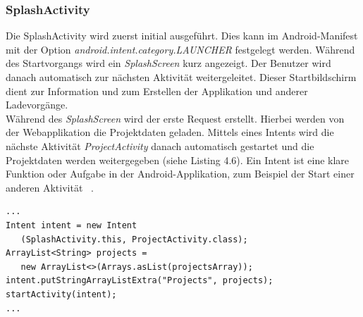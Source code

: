 \subsubsection{SplashActivity}
Die SplashActivity wird zuerst initial ausgeführt. Dies kann im Android-Manifest mit der Option \textit{android.intent.category.LAUNCHER} festgelegt werden. Während des Startvorgangs wird ein \textit{SplashScreen} kurz angezeigt. Der Benutzer wird danach automatisch zur nächsten Aktivität weitergeleitet. Dieser Startbildschirm dient zur Information und zum Erstellen der Applikation und anderer Ladevorgänge. \\ Während des \textit{SplashScreen} wird der erste Request erstellt. Hierbei werden von der Webapplikation die Projektdaten geladen. Mittels eines Intents wird die nächste Aktivität \textit{ProjectActivity} danach automatisch gestartet und die Projektdaten werden weitergegeben (siehe Listing 4.6). Ein Intent ist eine klare Funktion oder Aufgabe in der Android-Applikation, zum Beispiel der Start einer anderen Aktivität ~\parencite{vogelIntent}.
\lstset{
  caption=[Starten einer neuen Aktivität.]{Listing für die Erstellung eines neuen Intents, für den Wechsel der \textit{Activity} zur \textit{ProjectActivity}. Im Intent werden die geladenen Projektnamen hinzugefügt und in der neuen \textit{Activity} ausgelesen.},
  basicstyle=\small\ttfamily, 
  label=lst:config, 
  language=Java,
  frame=single,
  breaklines=true, %
  postbreak=\mbox{\textcolor{red}{$\hookrightarrow$}\space},
}

\begin{samepage}%
	\begin{lstlisting}[float=tbhp]
...
Intent intent = new Intent
   (SplashActivity.this, ProjectActivity.class);
ArrayList<String> projects = 
   new ArrayList<>(Arrays.asList(projectsArray));
intent.putStringArrayListExtra("Projects", projects);
startActivity(intent);
...  

	\end{lstlisting}
\end{samepage}
